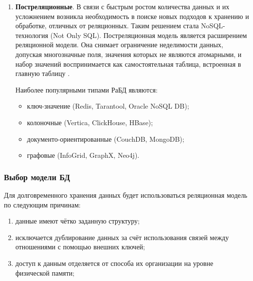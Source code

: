 \begin{enumerate}[label*=\arabic*.]
\begin{itemize}[label*=---]
	\end{itemize}
	
	
	\item \textbf{Постреляционные}. \newline
	В связи с быстрым ростом количества данных и их усложнением возникла необходимость в поиске новых подходов к хранению и обработке, отличных от реляционных. Таким решением стала NoSQL-технология (Not Only SQL). Постреляционная модель является расширением реляционной модели. Она снимает ограничение неделимости данных, допуская многозначные поля, значения которых не являются атомарными, и набор значений воспринимается как самостоятельная таблица, встроенная в главную таблицу \cite{Markin}.
	
	Наиболее популярными типами РаБД являются:
	
	\begin{itemize}[label*=---]
		\item ключ-значение (Redis, Tarantool, Oracle NoSQL DB);
		\item колоночные (Vertica, ClickHouse, HBase);
		\item документо-ориентированные (CouchDB, MongoDB);
		\item графовые (InfoGrid, GraphX, Neo4j).
	
	\end{itemize}
	
\end{enumerate}



\subsubsection{Выбор модели БД}

Для долговременного хранения данных будет использоваться реляционная модель по следующим причинам:

\begin{enumerate}[label*=\arabic*)]
	\item данные имеют чётко заданную структуру;
	\item исключается дублирование данных за счёт использования связей между отношениями с помощью внешних ключей;
	\item доступ к данным отделяется от способа их организации на уровне физической памяти;
	
\end{enumerate}


